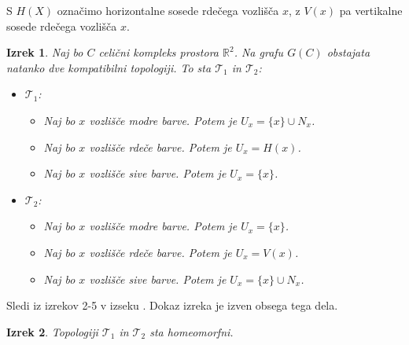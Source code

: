 \documentclass[a4paper, 12pt]{book}
\newtheorem{theorem}{Izrek}[section]
\theoremstyle{definition}
\theoremstyle{remark}
\begin{document}
S $H(X)$ označimo horizontalne sosede rdečega vozlišča $x$, z $V(x)$ pa vertikalne
sosede rdečega vozlišča $x$.\\
\begin{theorem}
  Naj bo $C$ celični kompleks prostora $\mathbb{R}^2$. Na grafu $G(C)$ obstajata
  natanko dve kompatibilni topologiji. To sta $\mathcal{T}_1$ in $\mathcal{T}_2$:
  \begin{itemize}
    \item $\mathcal{T}_1$:
      \begin{itemize}
        \item Naj bo $x$ vozlišče modre barve. Potem je $U_x = \{x\} \cup N_x$.
        \item Naj bo $x$ vozlišče rdeče barve. Potem je $U_x = H(x)$.
        \item Naj bo $x$ vozlišče sive barve. Potem je $U_x = \{x\}$.
      \end{itemize}
      \item $\mathcal{T}_2$:
      \begin{itemize}
        \item Naj bo $x$ vozlišče modre barve. Potem je $U_x = \{x\}$.
        \item Naj bo $x$ vozlišče rdeče barve. Potem je $U_x = V(x)$.
        \item Naj bo $x$ vozlišče sive barve. Potem je $U_x = \{x\} \cup N_x$.
      \end{itemize}
  \end{itemize}
\end{theorem}
Sledi iz izrekov 2-5 v izseku .
Dokaz izreka je izven obsega tega dela.
\begin{theorem}
  Topologiji $\mathcal{T}_1$ in $\mathcal{T}_2$ sta homeomorfni.
\end{theorem}
\end{document}
